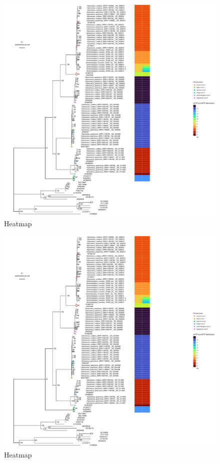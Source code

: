 \documentclass[fleqn,10pt,lineno]{wlpeerj}
\begin{document}
{%
\newpage{}
 \begin{figure}[ht]
 \centering
 \includegraphics[width=1\linewidth]{figures/tree_rect_delim_info.pdf}
 \begin{NoHyper}
 \caption{
Heatmap
}
 \label{fig:fig2}
 \end{NoHyper}
 \end{figure}
 
\newpage{}
 \begin{figure}[ht]
 \centering
 \includegraphics[width=1\linewidth]{figures/tree_rect_delim_info.pdf}
 \begin{NoHyper}
 \caption{
Heatmap
}
 \label{fig:fig3}
 \end{NoHyper}
 \end{figure}



}
\end{document}
